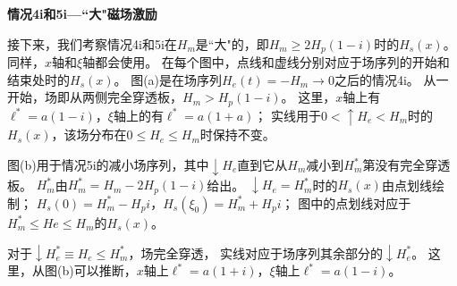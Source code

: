 \textbf{情况4i和5i---``大"磁场激励}

接下来，我们考察情况4i和5i在$H_m$是``大"的，即$H_m\ge 2H_p(1-i)$时的$H_s(x)$。
同样，$x$轴和$\xi$轴都会使用。
在每个图中，点线和虚线分别对应于场序列的开始和结束处时的$H_s(x)$。
图(a)是在场序列$H_e(t)= -H_m\rightarrow 0$之后的情况4i。
从一开始，场即从两侧完全穿透板，$H_m> H_p(1-i)$。
这里，$x$轴上有$\ell^*= a(1-i)$，$\xi$轴上的有$\ell^*= a(1+a)$；
实线用于$0 <\uparrow H_e <H_m$时的$H_s(x)$，该场分布在$0\le H_e\le H_m$时保持不变。

图(b)用于情况5i的减小场序列，其中$\downarrow H_e$直到它从$H_m$减小到$H_m^*$第没有完全穿透板。
$H_m^*$由$H_m^*= H_m -2H_p(1-i)$给出。
$\downarrow H_e = H_m^*$时的$H_s(x)$由点划线绘制；
$H_s(0)= H_m^* -H_p i$，$H_s(\xi_0)= H_m^* + H_p i$；
图中的点划线对应于$H_m^*\le He\le H_m$的$H_s(x)$。

对于$\downarrow H_e^*\equiv H_e\le H_m^*$，场完全穿透，
实线对应于场序列其余部分的$\downarrow H_e^*$。
这里，从图(b)可以推断，$x$轴上$\ell^* = a(1+i)$，$\xi$轴上$\ell^* = a(1-i)$。

